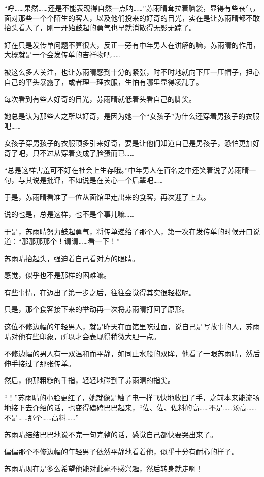 “呼……果然……还是不能表现得自然一点呐……”苏雨晴耷拉着脑袋，显得有些丧气，面对那些一个个陌生的客人，以及他们投来的好奇的目光，实在是让苏雨晴都不敢抬头看人了，刚一开始鼓起的勇气也早就消散得无影无踪了。

好在只是发传单问题不算很大，反正一旁有中年男人在讲解的嘛，苏雨晴的作用，大概就是一个会发传单的吉祥物吧……

被这么多人关注，也让苏雨晴感到十分的紧张，时不时地就向下压一压帽子，担心自己的平头暴露了，或者理一理衣服，生怕有哪里显得凌乱了。

每次看到有些人好奇的目光，苏雨晴就低着头看自己的脚尖。

她总是认为那些人之所以好奇，是因为她一个“女孩子”为什么还穿着男孩子的衣服吧……

女孩子穿男孩子的衣服顶多引来好奇，要是让他们知道自己是男孩子，恐怕更加好奇了吧，只不过从穿着变成了脸蛋而已……

“总是这样害羞可不好在社会上生存哦。”中年男人在百名之中还笑着说了苏雨晴一句，与其说是批评，不如说是在关心一个后辈吧……

于是，苏雨晴看准了一位从面馆里走出来的食客，再次迎了上去。

说的也是，总是这样，也不是个事儿嘛……

于是，苏雨晴努力鼓起勇气，将传单递给了那个人，第一次在发传单的时候开口说道：“那那那那个！请请……看一下！”

苏雨晴抬起头，强迫着自己看对方的眼睛。

感觉，似乎也不是那样的困难嘛。

有些事情，在迈出了第一步之后，往往会觉得其实很轻松呢。

只是，那个食客接下来的举动再一次将苏雨晴打回了原形。

这位不修边幅的年轻男人，就是昨天在面馆里吃过面，说自己是写故事的人，苏雨晴对他有些印象，所以才会表现得稍微大胆一点。

不修边幅的男人有一双温和而平静，如同止水般的双眸，他看了一眼苏雨晴，然后伸手接过了那张传单。

然后，他那粗糙的手指，轻轻地碰到了苏雨晴的指尖。

“！”苏雨晴的小脸更红了，她就像是触了电一样飞快地收回了手，之前本来能流畅地接下去介绍的话，也变得磕磕巴巴起来，“佐、佐、佐料的高……不是……汤高……不是……那个……高料……”

苏雨晴结结巴巴地说不完一句完整的话，感觉自己都快要哭出来了。

偏偏那个不修边幅的年轻男子依然平静地看着他，似乎十分有耐心的样子。

苏雨晴现在是多么希望他能对此毫不感兴趣，然后转身就走啊！

